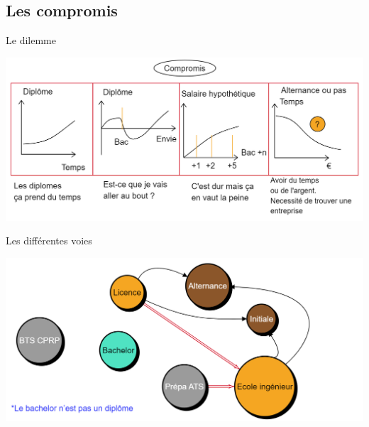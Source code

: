 \documentclass[usenames,dvipsnames,13pt,aspectratio=169]{beamer}
\begin{document}
\subsection{Les compromis}
\begin{frame}{Le dilemme}

	\begin{center}
	     \includegraphics[width=1\textwidth]{S12.png}
	\end{center}



\end{frame}








\begin{frame}{Les différentes voies}

	\begin{center}
	     \includegraphics[width=1\textwidth]{S11.png}
	\end{center}



\end{frame}
\end{document}
